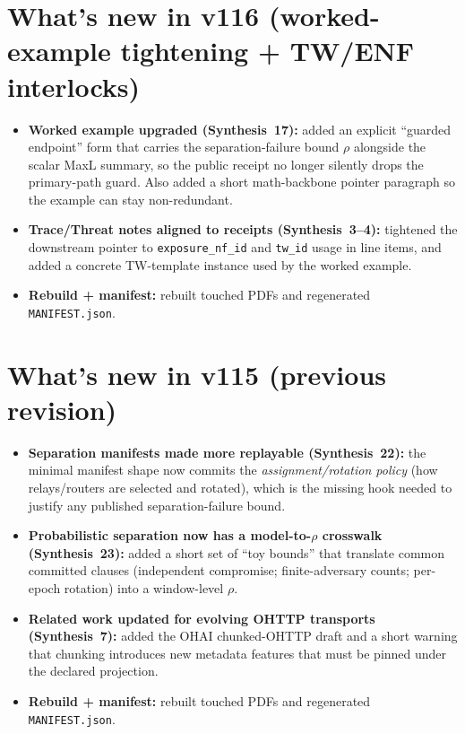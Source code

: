 \documentclass[11pt]{article}
\begin{document}
\section{What's new in v116 (worked-example tightening + TW/ENF interlocks)}
\begin{itemize}[leftmargin=*]
\item \textbf{Worked example upgraded (Synthesis~17):} added an explicit ``guarded endpoint'' form that carries the separation-failure bound $\rho$ alongside the scalar MaxL summary, so the public receipt no longer silently drops the primary-path guard. Also added a short math-backbone pointer paragraph so the example can stay non-redundant.
\item \textbf{Trace/Threat notes aligned to receipts (Synthesis~3--4):} tightened the downstream pointer to \texttt{exposure\_nf\_id} and \texttt{tw\_id} usage in line items, and added a concrete TW-template instance used by the worked example.
\item \textbf{Rebuild + manifest:} rebuilt touched PDFs and regenerated \texttt{MANIFEST.json}.
\end{itemize}

\section{What's new in v115 (previous revision)}
\begin{itemize}[leftmargin=*]
\item \textbf{Separation manifests made more replayable (Synthesis~22):} the minimal manifest shape now commits the \emph{assignment/rotation policy} (how relays/routers are selected and rotated), which is the missing hook needed to justify any published separation-failure bound.
\item \textbf{Probabilistic separation now has a model-to-$\rho$ crosswalk (Synthesis~23):} added a short set of ``toy bounds'' that translate common committed clauses (independent compromise; finite-adversary counts; per-epoch rotation) into a window-level $\rho$.
\item \textbf{Related work updated for evolving OHTTP transports (Synthesis~7):} added the OHAI chunked-OHTTP draft and a short warning that chunking introduces new metadata features that must be pinned under the declared projection.
\item \textbf{Rebuild + manifest:} rebuilt touched PDFs and regenerated \texttt{MANIFEST.json}.
\end{itemize}
\end{document}
